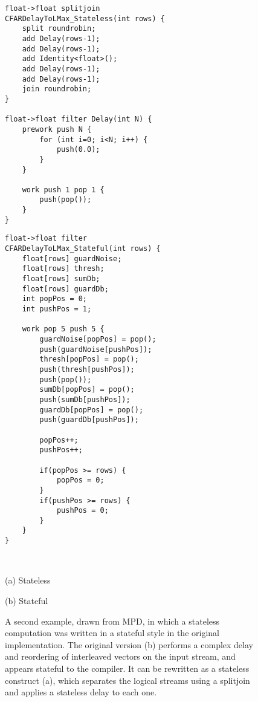 \begin{figure}[t]
\begin{minipage}{0.5\textwidth}
\centering
\ninepoint
\begin{verbatim}
float->float splitjoin 
CFARDelayToLMax_Stateless(int rows) {
    split roundrobin;
    add Delay(rows-1);
    add Delay(rows-1);
    add Identity<float>();
    add Delay(rows-1);
    add Delay(rows-1);
    join roundrobin;
}

float->float filter Delay(int N) {
    prework push N {
        for (int i=0; i<N; i++) {
            push(0.0);
        }
    }

    work push 1 pop 1 {
        push(pop());
    }
}
\end{verbatim}
\end{minipage}
\begin{minipage}{0.5\textwidth}
\centering
\ninepoint
\begin{verbatim}
float->float filter
CFARDelayToLMax_Stateful(int rows) {
    float[rows] guardNoise;
    float[rows] thresh;
    float[rows] sumDb;
    float[rows] guardDb;
    int popPos = 0;
    int pushPos = 1;

    work pop 5 push 5 {
        guardNoise[popPos] = pop();
        push(guardNoise[pushPos]);
        thresh[popPos] = pop();
        push(thresh[pushPos]);
        push(pop());
        sumDb[popPos] = pop();
        push(sumDb[pushPos]);
        guardDb[popPos] = pop();
        push(guardDb[pushPos]);

        popPos++;
        pushPos++;

        if(popPos >= rows) {
            popPos = 0;
        }
        if(pushPos >= rows) {
            pushPos = 0;
        }
    }
}
\end{verbatim}
\end{minipage}
~ \\
\begin{minipage}{0.5\textwidth}
\centering
(a) Stateless
\end{minipage}
\begin{minipage}{0.5\textwidth}
\centering
(b) Stateful
\end{minipage}
\caption[Accidental introduction of filter state (real example)]{A 
  second example, drawn from MPD, in which a stateless computation was
  written in a stateful style in the original implementation.  The
  original version (b) performs a complex delay and reordering of
  interleaved vectors on the input stream, and appears stateful to the
  compiler.  It can be rewritten as a stateless construct (a), which
  separates the logical streams using a splitjoin and applies a
  stateless delay to each one.\protect\label{fig:state2}}
\end{figure}

